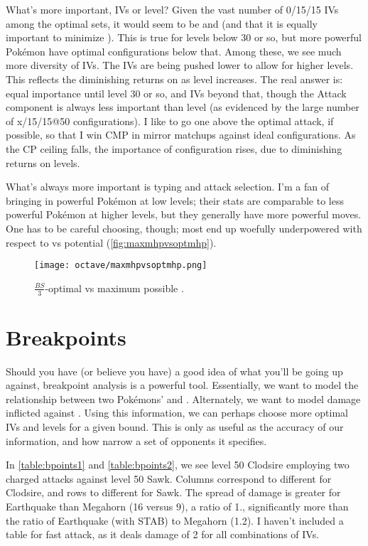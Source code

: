 What's more important, IVs or level?
Given the vast number of 0/15/15 IVs among the optimal sets, it
  would seem to be  and  (and that it is equally
  important to minimize ).
This is true for levels below 30 or so, but more powerful Pokémon
  have optimal configurations below that.
Among these, we see much more diversity of IVs.
The IVs are being pushed lower to allow for higher levels.
This reflects the diminishing returns on \CPM{} as level increases.
The real answer is: equal importance until level 30 or so, and IVs beyond that,
  though the Attack component is always less important than level
  (as evidenced by the large number of x/15/15@50 configurations).
I like to go one above the optimal attack, if possible, so that I
  win CMP in mirror matchups against ideal configurations.
As the CP ceiling falls, the importance of configuration rises,
  due to diminishing returns on levels.

What's always more important is typing and attack selection.
I'm a fan of bringing in powerful Pokémon at low levels; their stats are
  comparable to less powerful Pokémon at higher levels, but they
  generally have more powerful moves.
One has to be careful choosing, though; most end up woefully underpowered
  with respect to \MHP{} vs potential \MHP{} (\autoref{fig:maxmhpvsoptmhp}).
\begin{figure}
\texttt{[image: octave/maxmhpvsoptmhp.png]}
  \caption{$\frac{\mathit{BS}}{3}$-optimal \MHP{} vs maximum possible \MHP.\label{fig:maxmhpvsoptmhp}}
\end{figure}

\section{Breakpoints\label{sec:breakpoints}}
Should you have (or believe you have) a good idea of what you'll be going up against,
 breakpoint analysis is a powerful tool.
Essentially, we want to model the relationship between two Pokémons' 
 and .
Alternately, we want to model damage inflicted against \MHP\@.
Using this information, we can perhaps choose more optimal IVs and levels for a given \CP{} bound.
This is only as useful as the accuracy of our information, and how narrow a set of opponents it specifies.

In \autoref{table:bpoints1} and \autoref{table:bpoints2}, we see level 50 Clodsire
  employing two charged attacks against level 50 Sawk.
Columns correspond to different  for Clodsire, and rows to different  for Sawk.
The spread of damage is greater for Earthquake than Megahorn (16 versus 9), a ratio
  of 1., significantly more than the ratio of Earthquake (with STAB)
  to Megahorn (1.2).
I haven't included a table for fast attack, as it deals damage of 2 for all combinations of IVs.

